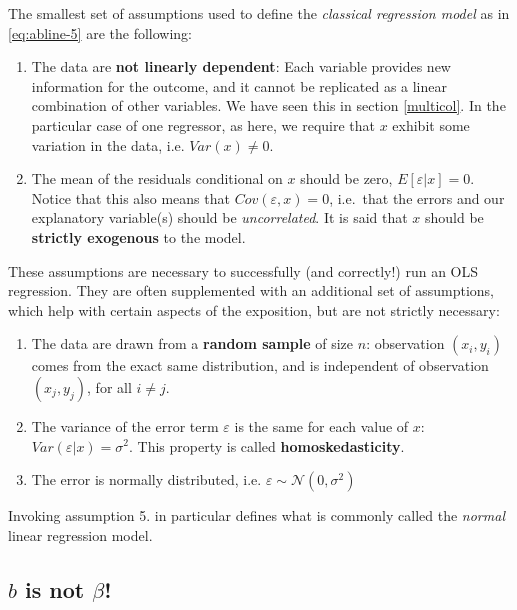 \documentclass[]{book}
\providecommand{\tightlist}{%
  \setlength{\itemsep}{0pt}\setlength{\parskip}{0pt}}
\begin{document}
The smallest set of assumptions used to define the \emph{classical
regression model} as in \eqref{eq:abline-5} are the following:

\begin{enumerate}
\def\labelenumi{\arabic{enumi}.}
\tightlist
\item
  The data are \textbf{not linearly dependent}: Each variable provides
  new information for the outcome, and it cannot be replicated as a
  linear combination of other variables. We have seen this in section
  \ref{multicol}. In the particular case of one regressor, as here, we
  require that \(x\) exhibit some variation in the data, i.e.
  \(Var(x)\neq 0\).
\item
  The mean of the residuals conditional on \(x\) should be zero,
  \(E[\varepsilon|x] = 0\). Notice that this also means that
  \(Cov(\varepsilon,x) = 0\), i.e.~that the errors and our explanatory
  variable(s) should be \emph{uncorrelated}. It is said that \(x\)
  should be \textbf{strictly exogenous} to the model.
\end{enumerate}

These assumptions are necessary to successfully (and correctly!) run an
OLS regression. They are often supplemented with an additional set of
assumptions, which help with certain aspects of the exposition, but are
not strictly necessary:

\begin{enumerate}
\def\labelenumi{\arabic{enumi}.}
\setcounter{enumi}{2}
\tightlist
\item
  The data are drawn from a \textbf{random sample} of size \(n\):
  observation \((x_i,y_i)\) comes from the exact same distribution, and
  is independent of observation \((x_j,y_j)\), for all \(i\neq j\).
\item
  The variance of the error term \(\varepsilon\) is the same for each
  value of \(x\): \(Var(\varepsilon|x) = \sigma^2\). This property is
  called \textbf{homoskedasticity}.
\item
  The error is normally distributed, i.e.
  \(\varepsilon \sim \mathcal{N}(0,\sigma^2)\)
\end{enumerate}

Invoking assumption 5. in particular defines what is commonly called the
\emph{normal} linear regression model.

\subsection{\texorpdfstring{\(b\) is not
\(\beta\)!}{b is not \textbackslash{}beta!}}\label{b-is-not-beta}
\end{document}
